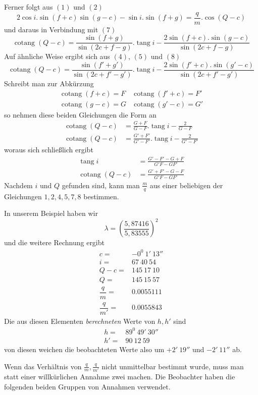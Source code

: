 Ferner folgt aus $(1)$ und $(2)$
\[
2\cos i.\sin(f+c)\sin(g-c)-\sin i.\sin(f+g)=\frac{q}{m}.\cos(Q-c)
\]
und daraus in Verbindung mit $(7)$
\[
\operatorname{cotang}(Q-c)=\frac{\sin(f+g)}{\sin(2c+f-g)}.\operatorname{tang}i-\frac{2\sin(f+c).\sin(g-c)}{\sin(2c+f-g)}
\]
Auf ähnliche Weise ergibt sich aus $(4)$, $(5)$ und $(8)$
\[
\operatorname{cotang}(Q-c)=\frac{\sin(f'+g')}{\sin(2c+f'-g')}.\operatorname{tang}i-\frac{2\sin(f'+c).\sin(g'-c)}{\sin(2c+f'-g')}
\]
Schreibt man zur Abkürzung
\[
\begin{array}{ll}
\operatorname{cotang}(f+c)=F&\operatorname{cotang}(f'+c)=F'\\
\operatorname{cotang}(g-c)=G&\operatorname{cotang}(g'-c)=G'
\end{array}
\]
so nehmen diese beiden Gleichungen die Form an
\[
\begin{aligned}
\operatorname{cotang}(Q-c)&=\frac{G+F}{G-F}.\operatorname{tang}i-\frac{2}{G-F}\\
\operatorname{cotang}(Q-c)&=\frac{G'+F'}{G'-F'}.\operatorname{tang}i-\frac{2}{G'-F'}
\end{aligned}
\]
woraus sich schließlich ergibt
\[
\begin{aligned}
\operatorname{tang}i&=\frac{G'-F'-G+F}{G'F-GF'}\\
\operatorname{cotang}(Q-c)&=\frac{G'+F'-G-F}{G'F-GF'}
\end{aligned}
\]
Nachdem $i$ und $Q$ gefunden sind, kann man $\frac{m}{q}$ aus einer beliebigen der Gleichungen $1,2,4,5,7,8$ bestimmen.

In unserem Beispiel haben wir
\[
\lambda=\left(\frac{5{,}87416}{5{,}83555}\right)^2
\]
und die weitere Rechnung ergibt
\[
\begin{array}{rl}
c=&-0^0\ 1'\ 13''\\
i=&67\ 40\ 54\\
Q-c=&145\ 17\ 10\\
Q=&145\ 15\ 57\\
\dfrac{q}{m}=&0.0055111\\[4pt]
\dfrac{q}{m'}=&0.0055843
\end{array}
\]
Die aus diesen Elementen \textit{berechneten} Werte von $h,h'$ sind
\[
\begin{array}{rl}
h=&89^0\ 49'\ 30''\\
h'=&90\ 12\ 59
\end{array}
\]
von diesen weichen die beobachteten Werte also um $+2'\ 19''$ und $-2'\ 11''$ ab.

Wenn das Verhältnis von $\frac{q}{m},\frac{q}{m'}$ nicht unmittelbar bestimmt wurde, muss man statt einer willkürlichen Annahme zwei machen. Die Beobachter haben die folgenden beiden Gruppen von Annahmen verwendet.

